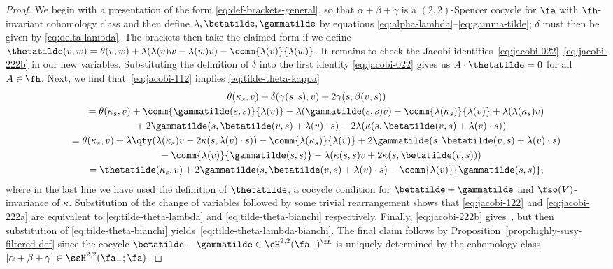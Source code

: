 \begin{proof}
	We begin with a presentation of the form \eqref{eq:def-brackets-general}, so that $\alpha+\beta+\gamma$ is a $(2,2)$-Spencer cocycle for $\fa$ with $\fh$-invariant cohomology class and then define $\lambda,\betatilde,\gammatilde$ by equations \eqref{eq:alpha-lambda}--\eqref{eq:gamma-tilde}; $\delta$ must then be given by \eqref{eq:delta-lambda}. The brackets then take the claimed form if we define
$\thetatilde(v,w) = \theta(v,w) + \lambda(\lambda(v)w-\lambda(w)v) - \comm{\lambda(v)}{\lambda(w)}$.
	It remains to check the Jacobi identities~\eqref{eq:jacobi-022}--\eqref{eq:jacobi-222b} in our new variables. Substituting the definition of $\delta$ into the first identity \eqref{eq:jacobi-022} gives us $A\cdot \thetatilde=0$ for all $A\in\fh$. Next, we find that~\eqref{eq:jacobi-112} implies \eqref{eq:tilde-theta-kappa}
	\begin{gather*}
		\theta(\kappa_s,v) + \delta(\gamma(s,s),v) + 2\gamma(s,\beta(v,s)) \\
		\qquad= \theta(\kappa_s,v) + \comm{\gammatilde(s,s)}{\lambda(v)} - \lambda(\gammatilde(s,s)v) - \comm{\lambda(\kappa_s)}{\lambda(v)} + \lambda(\lambda(\kappa_s)v) \\
		\phantom{\qquad=}{}+ 2\gammatilde(s,\betatilde(v,s)+\lambda(v)\cdot s) - 2\lambda(\kappa(s,\betatilde(v,s)+\lambda(v)\cdot s)) \\
	\qquad	= \theta(\kappa_s,v) + \lambda\qty(\lambda(\kappa_s)v - 2\kappa(s,\lambda(v)\cdot s)) - \comm{\lambda(\kappa_s)}{\lambda(v)} + 2\gammatilde(s,\betatilde(v,s)+\lambda(v)\cdot s)\\
			\phantom{\qquad=}{}- \comm{\lambda(v)}{\gammatilde(s,s)}
			- \lambda(\kappa(s,s)v + 2\kappa(s,\betatilde(v,s)))\\
		\qquad= \thetatilde(\kappa_s,v) + 2\gammatilde(s,\betatilde(v,s)+\lambda(v)\cdot s) - \comm{\lambda(v)}{\gammatilde(s,s)},
	\end{gather*}
	where in the last line we have used the definition of $\thetatilde$, a cocycle condition for $\betatilde+\gammatilde$ and $\fso(V)$-invariance of $\kappa$. Substitution of the change of variables followed by some trivial rearrangement shows that \eqref{eq:jacobi-122} and \eqref{eq:jacobi-222a} are equivalent to \eqref{eq:tilde-theta-lambda} and \eqref{eq:tilde-theta-bianchi} respectively. Finally, \eqref{eq:jacobi-222b} gives~,
	but then substitution of \eqref{eq:tilde-theta-bianchi} yields~\eqref{eq:tilde-theta-lambda-bianchi}. The final claim follows by Proposition~\ref{prop:highly-susy-filtered-def} since the cocycle $\betatilde+\gammatilde\in\cH^{2,2}(\fa_-)^\fh$ is uniquely determined by the cohomology class $[\alpha+\beta+\gamma]\in\ssH^{2,2}(\fa_-;\fa)$.
\end{proof}

